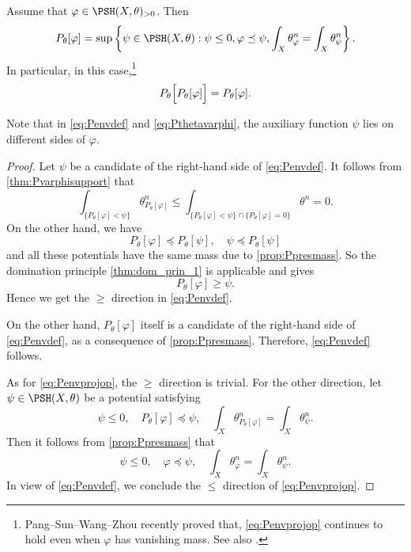 \begin{theorem}\label{thm:Pvarphidiffdef}
    Assume that $\varphi\in \PSH(X,\theta)_{>0}$. Then
    \begin{equation}\label{eq:Penvdef}
    P_{\theta}[\varphi]=\sup\left\{\psi\in \PSH(X,\theta): \psi\leq 0,\varphi\preceq \psi, \int_X \theta_{\varphi}^n=\int_X \theta_{\psi}^n\right\}.
    \end{equation}
    In particular, in this case,\footnote{Pang--Sun--Wang--Zhou \cite{PSWZ26} recently proved that, \eqref{eq:Penvprojop} continues to hold even when $\varphi$ has vanishing mass. See also \cite[Theorem~17.5.3]{FPT}.}
    \begin{equation}\label{eq:Penvprojop}
    P_{\theta}\Bigl[P_{\theta}[\varphi]\Bigr]=P_{\theta}[\varphi].
    \end{equation}
\end{theorem}
Note that in \eqref{eq:Penvdef} and \eqref{eq:Pthetavarphi}, the auxiliary function $\psi$ lies on different sides of $\varphi$.
\begin{proof}
     Let $\psi$ be a candidate of the right-hand side of \eqref{eq:Penvdef}. It follows from \cref{thm:Pvarphisupport} that
     \[
     \int_{\{P_{\theta}[\varphi]<\psi \}} \theta_{P_{\theta}[\varphi]}^n\leq \int_{\{P_{\theta}[\varphi]<\psi \}\cap \{P_{\theta}[\varphi]=0\} } \theta^n=0.
     \]
     On the other hand, we have
    \[
    P_{\theta}[\varphi]\preceq P_{\theta}[\psi],\quad \psi\preceq P_{\theta}[\psi]
    \]
    and all these potentials have the same mass due to \cref{prop:Ppresmass}. So the domination principle \cref{thm:dom_prin_1} is applicable and gives
    \[
    P_{\theta}[\varphi]\geq \psi.
    \]
    Hence we get the $\geq$ direction in \eqref{eq:Penvdef}.

    On the other hand, $P_{\theta}[\varphi]$ itself is a candidate of the right-hand side of \eqref{eq:Penvdef}, as a consequence of \cref{prop:Ppresmass}. Therefore, \eqref{eq:Penvdef} follows.

    As for \eqref{eq:Penvprojop}, the $\geq$ direction is trivial. For the other direction, let $\psi\in \PSH(X,\theta)$ be a potential satisfying
    \[
    \psi\leq 0,\quad P_{\theta}[\varphi]\preceq \psi,\quad \int_X \theta_{P_{\theta}[\varphi]}^n=\int_X \theta_{\psi}^n.
    \]
    Then it follows from \cref{prop:Ppresmass} that
    \[
    \psi\leq 0,\quad \varphi\preceq \psi,\quad \int_X \theta_{\varphi}^n=\int_X \theta_{\psi}^n.
    \]
    In view of \eqref{eq:Penvdef}, we conclude the $\leq$ direction of \eqref{eq:Penvprojop}.
\end{proof}


